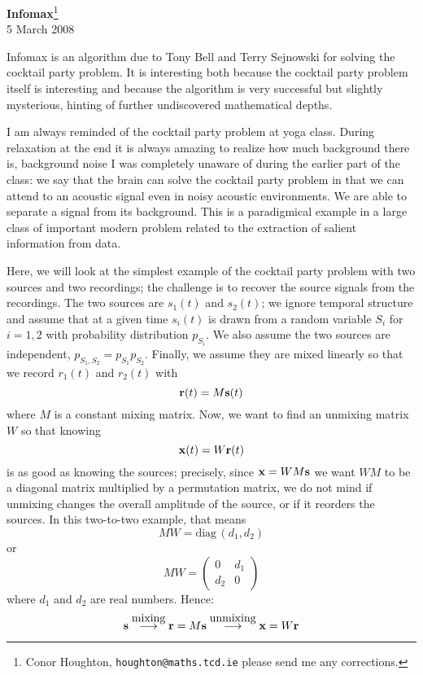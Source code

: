 \documentclass[12pt]{article}
\begin{document}
\begin{center}{\Large
{\bf Infomax}\footnote{Conor Houghton, {\tt houghton@maths.tcd.ie} please
send me any corrections.}}\\[1cm] 5 March 2008\\[1cm]
\end{center}

Infomax is an algorithm due to Tony Bell and Terry Sejnowski for
solving the cocktail party problem. It is interesting both because the
cocktail party problem itself is interesting and because the algorithm
is very successful but slightly mysterious, hinting of further undiscovered
mathematical depths. 

I am always reminded of the cocktail party problem at yoga class.
During relaxation at the end it is always amazing to realize how much
background there is, background noise I was completely unaware of
during the earlier part of the class: we say that the brain can solve
the cocktail party problem in that we can attend to an acoustic signal
even in noisy acoustic environments. We are able to separate a signal
from its background. This is a paradigmical example in a large class
of important modern problem related to the extraction of salient
information from data.

Here, we will look at the simplest example of the cocktail party
problem with two sources and two recordings; the challenge is to
recover the source signals from the recordings. The two sources are
$s_1(t)$ and $s_2(t)$; we ignore temporal structure and assume that at
a given time $s_i(t)$ is drawn from a random variable $S_i$ for
$i=1,2$ with probability distribution $p_{S_i}$. We also assume the
two sources are independent, $p_{S_1,S_2}=p_{S_1}p_{S_2}$. Finally, we assume
they are mixed linearly so that we record $r_1(t)$ and $r_2(t)$ with
\begin{equation}
{\bf r}(t)=M{\bf s}(t)
\end{equation}
where $M$ is a constant mixing matrix. Now, we want to find an unmixing matrix $W$ so that knowing 
\begin{equation}
{\bf x}(t)=W{\bf r}(t)
\end{equation}
is as good as knowing the sources; precisely, since ${\bf x}=WM{\bf s}$ we want $WM$ to be a diagonal matrix multiplied by a permutation matrix, we do not mind if unmixing changes the overall amplitude of the source, or if it reorders the sources. In this two-to-two example, that means 
\begin{equation}
MW=\mbox{diag}\,(d_1,d_2)
\end{equation}
or
\begin{equation}
MW=\left(\begin{array}{cc}0&d_1\\d_2&0\end{array}\right)
\end{equation}
where $d_1$ and $d_2$ are real numbers. Hence:
\begin{equation}
{\bf s}\stackrel{\mbox{mixing}}{\longrightarrow}{\bf r}=M{\bf s}\stackrel{\mbox{unmixing}}{\longrightarrow}{\bf x}=W{\bf r}
\end{equation}
\end{document}
